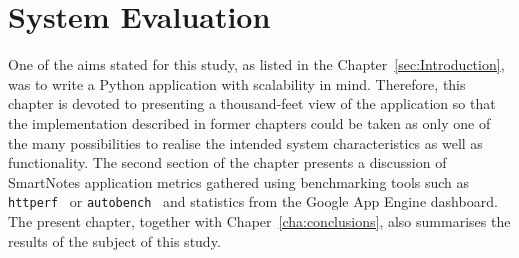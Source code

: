 \chapter{System Evaluation}\label{chap:eval}
One of the aims stated for this study, as listed in the Chapter~\ref{sec:Introduction}, was to write a Python application with scalability in mind. Therefore, this chapter is devoted to presenting a thousand-feet view of the application so that the implementation described in former chapters could be taken as only one of the many possibilities to realise the intended system characteristics as well as functionality. The second section of the chapter presents a discussion of SmartNotes application metrics gathered using benchmarking tools such as \texttt{httperf}~\cite{httperf_tool} or \texttt{autobench}~\cite{autobench_tool} and statistics from the Google App Engine dashboard. The present chapter, together with Chaper~\ref{cha:conclusions}, also summarises the results of the subject of this study.
 
